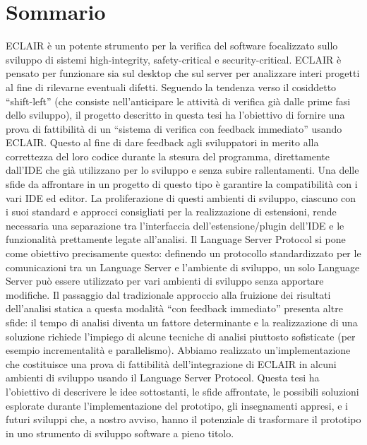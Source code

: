 \chapter*{Sommario}
ECLAIR è un potente strumento per la verifica del software focalizzato sullo sviluppo di sistemi high-integrity, safety-critical e security-critical. ECLAIR è pensato per funzionare sia sul desktop che sul server per analizzare interi progetti al fine di rilevarne eventuali difetti. Seguendo la tendenza verso il cosiddetto ``shift-left'' (che consiste nell'anticipare le attività di verifica già dalle prime fasi dello sviluppo), il progetto descritto in questa tesi ha l'obiettivo di fornire una prova di fattibilità di un ``sistema di verifica con feedback immediato'' usando ECLAIR. Questo al fine di dare feedback agli sviluppatori in merito alla correttezza del loro codice durante la stesura del programma, direttamente dall'IDE che già utilizzano per lo sviluppo e senza subire rallentamenti.
Una delle sfide da affrontare in un progetto di questo tipo è garantire la compatibilità con i vari IDE ed editor. La proliferazione di questi ambienti di sviluppo, ciascuno con i suoi standard e approcci consigliati per la realizzazione di estensioni, rende necessaria una separazione tra l'interfaccia dell'estensione/plugin dell'IDE e le funzionalità prettamente legate all'analisi. Il Language Server Protocol si pone come obiettivo precisamente questo: definendo un protocollo standardizzato per le comunicazioni tra un Language Server e l'ambiente di sviluppo, un solo Language Server può essere utilizzato per vari ambienti di sviluppo senza apportare modifiche.
Il passaggio dal tradizionale approccio alla fruizione dei risultati dell'analisi statica a questa modalità ``con feedback immediato'' presenta altre sfide: il tempo di analisi diventa un fattore determinante e la realizzazione di una soluzione richiede l'impiego di alcune tecniche di analisi piuttosto sofisticate (per esempio incrementalità e parallelismo).
Abbiamo realizzato un'implementazione che costituisce una prova di fattibilità dell'integrazione di ECLAIR in alcuni ambienti di sviluppo usando il Language Server Protocol. Questa tesi ha l'obiettivo di descrivere le idee sottostanti, le sfide affrontate, le possibili soluzioni esplorate durante l'implementazione del prototipo, gli insegnamenti appresi, e i futuri sviluppi che, a nostro avviso, hanno il potenziale di trasformare il prototipo in uno strumento di sviluppo software a pieno titolo.

